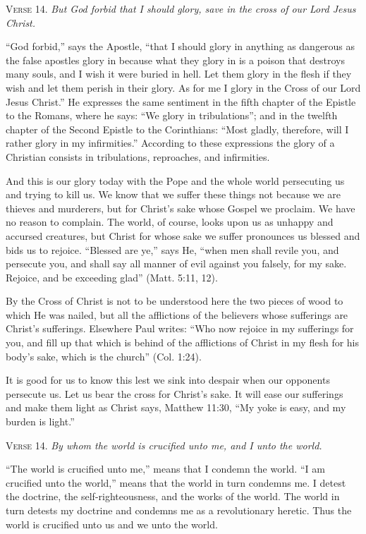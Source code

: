 \textsc{Verse} 14. \emph{But God forbid that I should glory, save in the cross of our Lord Jesus Christ.}

“God forbid,” says the Apostle, “that I should glory in anything as dangerous as the false apostles glory in because what they glory in is a poison that destroys many souls, and I wish it were buried in hell. Let them glory in the flesh if they wish and let them perish in their glory. As for me I glory in the Cross of our Lord Jesus Christ.” He expresses the same sentiment in the fifth chapter of the Epistle to the Romans, where he says: “We glory in tribulations”; and in the twelfth chapter of the Second Epistle to the Corinthians: “Most gladly, therefore, will I rather glory in my infirmities.” According to these expressions the glory of a Christian consists in tribulations, reproaches, and infirmities.

And this is our glory today with the Pope and the whole world persecuting us and trying to kill us. We know that we suffer these things not because we are thieves and murderers, but for Christ’s sake whose Gospel we proclaim. We have no reason to complain. The world, of course, looks upon us as unhappy and accursed creatures, but Christ for whose sake we suffer pronounces us blessed and bids us to rejoice. “Blessed are ye,” says He, “when men shall revile you, and persecute you, and shall say all manner of evil against you falsely, for my sake. Rejoice, and be exceeding glad” (Matt. 5:11, 12).

By the Cross of Christ is not to be understood here the two pieces of wood to which He was nailed, but all the afflictions of the believers whose sufferings are Christ’s sufferings. Elsewhere Paul writes: “Who now rejoice in my sufferings for you, and fill up that which is behind of the afflictions of Christ in my flesh for his body’s sake, which is the church” (Col. 1:24).

It is good for us to know this lest we sink into despair when our opponents persecute us. Let us bear the cross for Christ’s sake. It will ease our sufferings and make them light as Christ says, Matthew 11:30, “My yoke is easy, and my burden is light.”

\textsc{Verse} 14. \emph{By whom the world is crucified unto me, and I unto the world.}

“The world is crucified unto me,” means that I condemn the world. “I am crucified unto the world,” means that the world in turn condemns me. I detest the doctrine, the self-righteousness, and the works of the world. The world in turn detests my doctrine and condemns me as a revolutionary heretic. Thus the world is crucified unto us and we unto the world.

